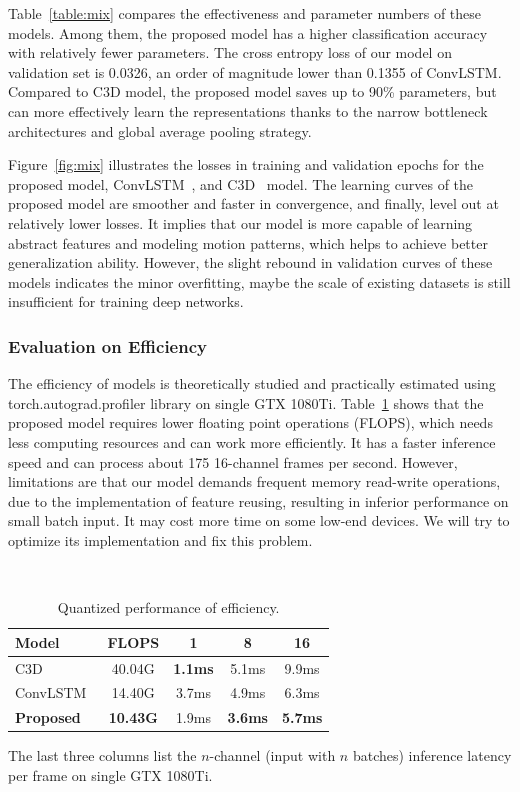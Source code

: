 \documentclass[10pt,twocolumn,letterpaper]{article}
\begin{document}
Table~\ref{table:mix} compares the effectiveness and parameter numbers of these models.
Among them, the proposed model has a higher classification accuracy with relatively fewer parameters.
The cross entropy loss of our model on validation set is 0.0326, an order of magnitude lower than 0.1355 of ConvLSTM.
Compared to C3D model, the proposed model saves up to 90\% parameters, but can more effectively learn the representations thanks to the narrow bottleneck architectures and global average pooling strategy.

Figure~\ref{fig:mix} illustrates the losses in training and validation epochs for the proposed model, ConvLSTM~\cite{convlstm_sudh}, and C3D~\cite{3dcnn_1} model.
The learning curves of the proposed model are smoother and faster in convergence, and finally, level out at relatively lower losses.
It implies that our model is more capable of learning abstract features and modeling motion patterns, which helps to achieve better generalization ability.
However, the slight rebound in validation curves of these models indicates the minor overfitting, maybe the scale of existing datasets is still insufficient for training deep networks. 

\subsubsection{Evaluation on Efficiency}

The efficiency of models is theoretically studied and practically estimated using torch.autograd.profiler library on single GTX 1080Ti.
Table~\ref{table:efficiency} shows that the proposed model requires lower floating point operations (FLOPS), which needs less computing resources and can work more efficiently.
It has a faster inference speed and can process about 175 16-channel frames per second.
However, limitations are that our model demands frequent memory read-write operations, due to the implementation of feature reusing, resulting in inferior performance on small batch input.
It may cost more time on some low-end devices.
We will try to optimize its implementation and fix this problem.


\begin{table}
\begin{center}
\caption{Quantized performance of efficiency.}
~\label{table:efficiency}
\begin{tabular}{lcccc}
\hline
\textbf{Model} & \textbf{FLOPS} & \textbf{1} & \textbf{8} & \textbf{16}\\
\hline\hline
C3D~\cite{3dcnn_1} & 40.04G & \textbf{1.1ms} & 5.1ms & 9.9ms \\
ConvLSTM~\cite{convlstm_sudh} & 14.40G & 3.7ms & 4.9ms & 6.3ms \\
\textbf{Proposed} & \textbf{10.43G} & 1.9ms & \textbf{3.6ms} & \textbf{5.7ms} \\
\hline
\end{tabular}
\end{center}
\footnotesize
The last three columns list the $n$-channel (\ie input with $n$ batches) inference latency per frame on single GTX 1080Ti.
\end{table}
\end{document}
